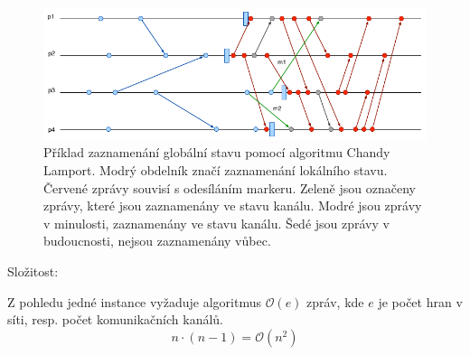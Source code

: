 \begin{compactitem}
    \begin{figure}[H]
        \centering
        \includegraphics[width=1\linewidth]{chandy_lamport_example.pdf}
        \caption{Příklad zaznamenání globální stavu pomocí algoritmu Chandy Lamport. Modrý obdelník značí zaznamenání lokálního stavu. Červené zprávy souvisí s odesíláním markeru. Zeleně jsou označeny zprávy, které jsou zaznamenány ve stavu kanálu. Modré jsou zprávy v minulosti, zaznamenány ve stavu kanálu. Šedé jsou zprávy v budoucnosti, nejsou zaznamenány vůbec.}
    \end{figure}

    \item Složitost: \begin{compactitem}
        \item Z pohledu jedné instance vyžaduje algoritmus $\mathcal{O}(e)$ zpráv, kde $e$ je počet hran v síti, resp. počet komunikačních kanálů.
        $$ n \cdot (n-1) = \mathcal{O}(n^2) $$
    \end{compactitem}
\end{compactitem}
